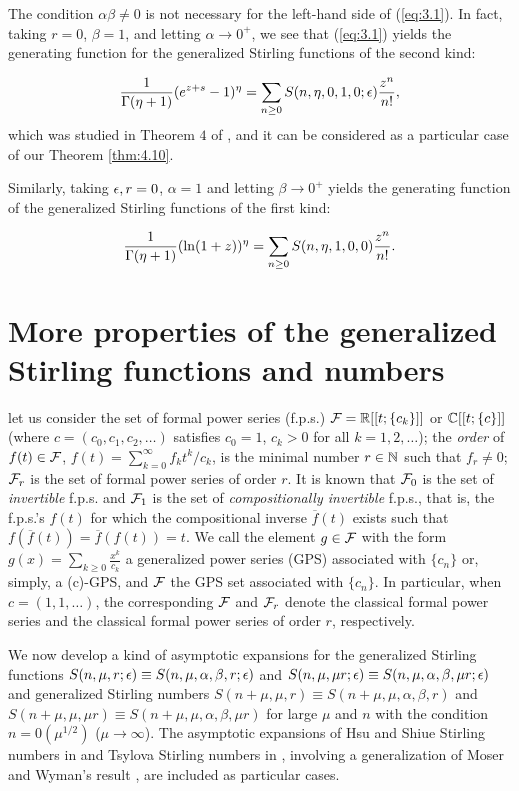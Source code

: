  The condition $\alpha \beta\not= 0$ is not necessary for the left-hand side of (\ref{eq:3.1}). In fact, taking $r=0$, $\beta =1$, and letting $\alpha \to 0^+$, we see that (\ref{eq:3.1}) yields the generating function for the generalized Stirling functions of the second kind:

\[
\frac{1}{{\Gamma}(\eta+1)} (e^{z+s}-1)^\eta =\sum _{n\geq 0} S(n,\eta, 0, 1,0;{\epsilon}) \frac{z^n}{n!},
\]
which was studied in Theorem $4$
of \cite{BKT03}, and it can be considered as a particular case of our Theorem \ref{thm:4.10}.

Similarly, taking ${\epsilon}, r=0$, $\alpha =1$ and letting $\beta\to 0^+$ yields the generating function of the generalized  Stirling functions of the first kind:

\[
\frac{1}{{\Gamma} (\eta +1)} (\ln (1+z))^\eta =\sum_{n\geq 0} S(n,\eta, 1,0,0)\frac{z^n}{n!}.
\]

\section{More properties of the generalized Stirling functions and numbers}
\setcounter{equation}{0}

let us consider the set of formal power series (f.p.s.) ${\cal F} = {{\mathbb R}}[[t; \{c_k\}]]$ or ${{\mathbb C}}[[t;\{ c\}]]$ (where $c=(c_0, c_1, c_2, \ldots)$ satisfies $c_0=1$, $c_k>0$ for all $k=1,2,\ldots$); the \emph{order} of $f(t) \in {\cal F}$, $f(t)=\sum_{k=0}^\infty f_kt^k/ c_k$, is the minimal number $r\in {{\mathbb N}}$ such that $f_r \neq 0$; ${\cal F}_r$ is the set of formal power series of order $r$. It is known that ${\cal F}_0$ is the set of \emph{invertible} f.p.s. and ${\cal F}_1$ is the set of \emph{compositionally invertible} f.p.s., that is, the f.p.s.'s $f(t)$ for which the compositional inverse $\overline{f}(t)$ exists such that $f(\overline{f}(t)) = \overline{f}(f(t)) = t$. We call the element $g\in {\cal F}$ with the form $g(x)=\sum_{k\geq 0} \frac{x^k}{c_k}$ a generalized power series (GPS) associated with $\{ c_n\}$ or, simply, a (c)-GPS, and ${\cal F}$ the GPS set associated with $\{ c_n\}$. In particular, when $c=(1,1, \ldots)$, the corresponding ${\cal F}$ and ${\cal F}_r$ denote the classical formal power series and the classical formal power series of order $r$, respectively.


We now develop a kind of asymptotic expansions for the generalized Stirling functions $S(n,\mu, r;{\epsilon})\equiv S(n, \mu, \alpha, \beta, r; {\epsilon})$ and $S(n,\mu, \mu r;{\epsilon})\equiv S(n, \mu, \alpha, \beta,\mu r; {\epsilon})$ and generalized Stirling numbers $S(n+\mu, \mu, r)\equiv S(n+\mu, \mu, \alpha,\beta, r)$ and $S(n+\mu, \mu, \mu r)\equiv S(n+\mu, \mu, \alpha,\beta, \mu r)$ for large $\mu$ and $n$ with the condition $n=0(\mu^{1/2})$ ($\mu\to \infty$). The  asymptotic expansions of Hsu and Shiue Stirling numbers in \cite{HS98} and Tsylova Stirling numbers in \cite{Tsy}, involving a generalization of Moser and Wyman's result \cite{MW}, are included as particular cases.

